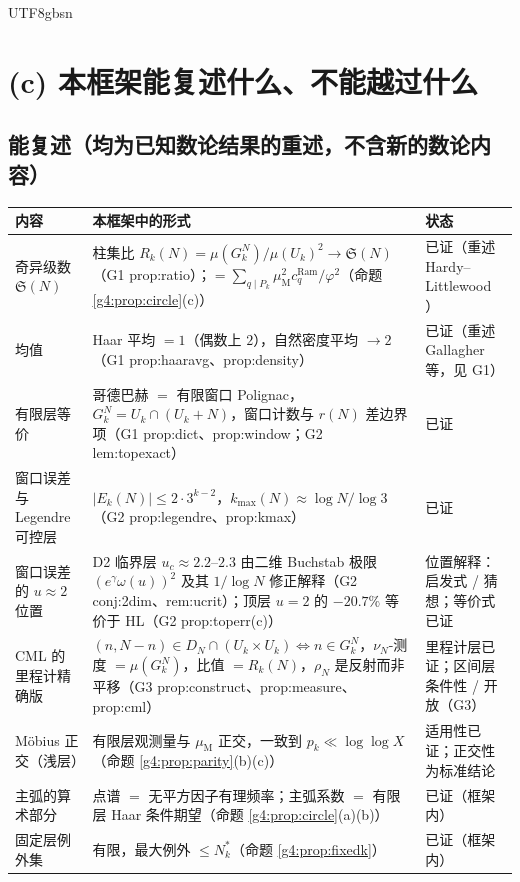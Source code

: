 \documentclass[11pt,a4paper]{article}
\newcommand{\Haar}{\mu}
\newcommand{\Sing}{\mathfrak S}
\newcommand{\kmax}{k_{\max}}           %
\newcommand{\Mob}{\mu_{\mathrm{M}}}    %
\newcommand{\Ram}{c^{\mathrm{Ram}}}    %
\theoremstyle{plain}
\theoremstyle{definition}
\begin{document}
\begin{CJK}{UTF8}{gbsn}
\section{(c) 本框架能复述什么、不能越过什么}\label{g4:sec:list}

\subsection{能复述（均为已知数论结果的重述，不含新的数论内容）}
\begin{center}
\begin{tabular}{p{4.4cm}p{6.0cm}p{4.0cm}}
\hline
内容 & 本框架中的形式 & 状态\\
\hline
奇异级数 $\Sing(N)$ & 柱集比 $R_k(N)=\Haar(G_k^N)/\Haar(U_k)^2\to\Sing(N)$（G1 prop:ratio）；$=\sum_{q\mid P_k}\Mob^2\Ram_q/\varphi^2$（命题 \ref{g4:prop:circle}(c)） & 已证（重述 Hardy--Littlewood \cite{HL23}）\\
均值 & Haar 平均 $=1$（偶数上 $2$），自然密度平均 $\to2$（G1 prop:haaravg、prop:density） & 已证（重述 Gallagher 等，见 G1）\\
有限层等价 & 哥德巴赫 $=$ 有限窗口 Polignac，$G_k^N=U_k\cap(U_k+N)$，窗口计数与 $r(N)$ 差边界项（G1 prop:dict、prop:window；G2 lem:topexact） & 已证\\
窗口误差与 Legendre 可控层 & $|E_k(N)|\le2\cdot3^{k-2}$，$\kmax(N)\approx\log N/\log3$（G2 prop:legendre、prop:kmax） & 已证\\
窗口误差的 $u\approx2$ 位置 & D2 临界层 $u_c\approx2.2$--$2.3$ 由二维 Buchstab 极限 $(e^\gamma\omega(u))^2$ 及其 $1/\log N$ 修正解释（G2 conj:2dim、rem:ucrit）；顶层 $u=2$ 的 $-20.7\%$ 等价于 HL（G2 prop:toperr(c)） & 位置解释：启发式 / 猜想；等价式已证\\
CML 的里程计精确版 & $(n,N-n)\in D_N\cap(U_k\times U_k)\iff n\in G_k^N$，$\nu_N$-测度 $=\Haar(G_k^N)$，比值 $=R_k(N)$，$\rho_N$ 是反射而非平移（G3 prop:construct、prop:measure、prop:cml） & 里程计层已证；区间层条件性 / 开放（G3）\\
M\"obius 正交（浅层） & 有限层观测量与 $\Mob$ 正交，一致到 $p_k\ll\log\log X$（命题 \ref{g4:prop:parity}(b)(c)） & 适用性已证；正交性为标准结论\\
主弧的算术部分 & 点谱 $=$ 无平方因子有理频率；主弧系数 $=$ 有限层 Haar 条件期望（命题 \ref{g4:prop:circle}(a)(b)） & 已证（框架内）\\
固定层例外集 & 有限，最大例外 $\le N_k^*$（命题 \ref{g4:prop:fixedk}） & 已证（框架内）\\
\hline
\end{tabular}
\end{center}


\end{CJK}
\end{document}
